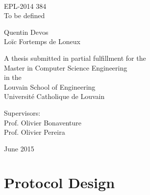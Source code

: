 \documentclass[11pt,a4paper,oldfontcommands]{memoir}
\begin{document}
%
%
\thispagestyle{empty}

{%
\sffamily
\centering
\Large

~\vspace{\fill}

EPL-2014 384\\
{\huge 
To be defined
}

\vspace{2.5cm}

{\LARGE
Quentin Devos \\
Loïc Fortemps de Loneux
}

\vspace{3.5cm}

A thesis submitted in partial fulfillment for the\\
Master in Computer Science Engineering\\[1em]
in the\\[1em]
Louvain School of Engineering\\
Université Catholique de Louvain

\vspace{3.5cm}

Supervisors: \\
            Prof. Olivier Bonaventure\\
             Prof. Olivier Pereira

\vspace{\fill}

June 2015

}%

\cleardoublepage

\tableofcontents*

\clearpage




\chapter{Protocol Design}
\end{document}
